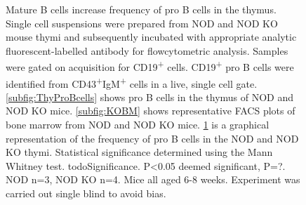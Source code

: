 \begin{figure}
\begin{subfigure}{\textwidth}
	\label{subfig:MatureBincproBgraph}
	\end{subfigure}
\caption[NOD mice have an increased frequency of pro B cells compared to NOD KO thymi]{Mature B cells increase frequency of pro B cells in the thymus.
Single cell suspensions were prepared from NOD and NOD KO mouse thymi and subsequently incubated with appropriate analytic fluorescent-labelled antibody for flowcytometric analysis.
Samples were gated on acquisition for CD19\textsuperscript{+} cells.
CD19\textsuperscript{+} pro B cells were identified from CD43\textsuperscript{+}IgM\textsuperscript{+} cells in a live, single cell gate.
\ref{subfig:ThyProBcells} shows pro B cells in the thymus of NOD and NOD KO mice.
\ref{subfig:KOBM} shows representative FACS plots of bone marrow from NOD and NOD KO mice.
\ref{subfig:MatureBincproBgraph} is a graphical representation of the frequency of pro B cells in the NOD and NOD KO thymi. Statistical significance determined using the Mann Whitney test. todoSignificance. P<0.05 deemed significant, P=?.
NOD n=3, NOD KO n=4. Mice all aged 6-8 weeks. Experiment was carried out single blind to avoid bias.}
\label{fig:MatureBincProB}
\end{figure}






